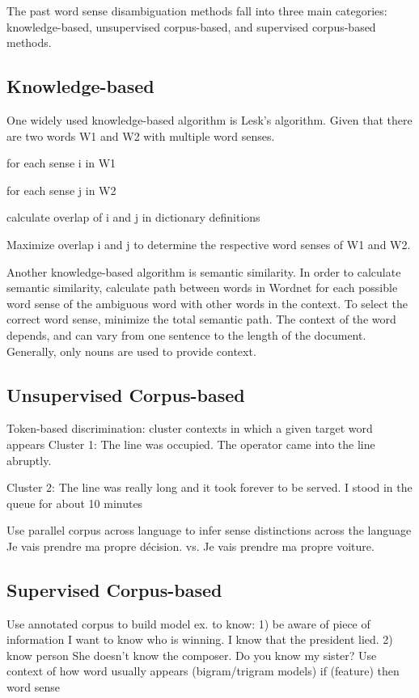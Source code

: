 \documentclass[10pt, letterpaper]{article}
\begin{document}
        The past word sense disambiguation methods fall into three main categories: knowledge-based, unsupervised corpus-based, and supervised corpus-based methods.

	\subsection{Knowledge-based}

        One widely used knowledge-based algorithm is Lesk's algorithm.  Given that there are two words W1 and W2 with multiple word senses.

	for each sense i in W1

	\indent for each sense j in W2

	\indent \indent calculate overlap of i and j in dictionary definitions

	Maximize overlap i and j to determine the respective word senses of W1 and W2.
	
        Another knowledge-based algorithm is semantic similarity.  In order to calculate semantic similarity, calculate path between words in Wordnet for each possible word sense of the ambiguous word with other words in the context.  To select the correct word sense, minimize the total semantic path.  The context of the word depends, and can vary from one sentence to the length of the document.  Generally, only nouns are used to provide context. 
	
	\subsection{Unsupervised Corpus-based}
	 Token-based discrimination: cluster contexts in which a given target word appears
	 Cluster 1: The line was occupied. 
	 The operator came into the line abruptly.

	 Cluster 2: The line was really long and it took forever to be served. 
 	 I stood in the queue for about 10 minutes

 	 Use parallel corpus across language to infer sense distinctions across the language
	 Je vais prendre ma propre décision.
	 vs.
	 Je vais prendre ma propre voiture.
	\subsection{Supervised Corpus-based}
	 Use annotated corpus to build model
 	 ex. to know: 1) be aware of piece of information
                              I want to know who is winning.
                              I know that the president lied.
                             2) know person
                             She doesn't know the composer.
                             Do you know my sister?
	 Use context of how word usually appears (bigram/trigram models)
 	 if (feature) then word sense
\end{document}
